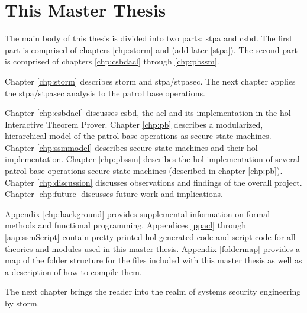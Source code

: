 \documentclass[../../main/main.tex]{subfiles}
\begin{document}
\section{This Master Thesis}\label{sec:thismasterthesis}
The main body of this thesis is divided into two parts: \gls{stpa} and \gls{csbd}. The first part is comprised of chapters \ref{chp:storm} and (add later \ref{stpa}).  The second part is comprised of chapters \ref{chp:csbdacl} through \ref{chp:pbssm}.


Chapter \ref{chp:storm} describes \gls{storm} and \gls{stpa}/\gls{stpasec}.  The next chapter applies the \gls{stpa}/\gls{stpasec} analysis to the patrol base operations.  

Chapter \ref{chp:csbdacl} discusses \gls{csbd}, the \gls{acl} and its implementation in the \Gls{hol} Interactive Theorem Prover.  Chapter \ref{chp:pb} describes a modularized, hierarchical model of the patrol base operations as secure state machines. Chapter \ref{chp:ssmmodel} describes secure state machines and their \gls{hol} implementation.  Chapter \ref{chp:pbssm} describes the \gls{hol} implementation of several patrol base operations secure state machines (described in chapter \ref{chp:pb}).  Chapter \ref{chp:discussion} discusses observations and findings of the overall project.  Chapter \ref{chp:future} discusses future work and implications. 

Appendix \ref{chp:background} provides supplemental information on formal methods and functional programming.  Appendices \ref{ppacl} through \ref{aap:ssmScript} contain pretty-printed \gls{hol}-generated code and script code for all theories and modules used in this master thesis.  Appendix \ref{foldermap} provides a map of the folder structure for the files included with this master thesis as well as a description of how to compile them.

The next chapter brings the reader into the realm of systems security engineering by \gls{storm}.
\end{document}
